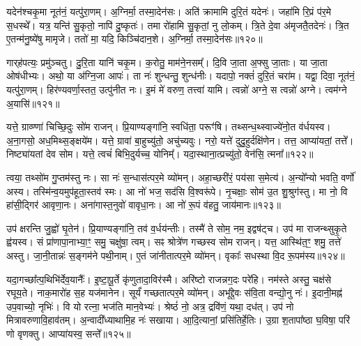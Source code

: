 यदेन॑श्चकृ॒मा नूत॑नं॒ यत्पु॑रा॒णम्।
अ॒ग्निर्मा॒ तस्मा॒देन॑सः।
अति॑ क्रामामि दुरि॒तं यदेनः॑।
जहा॑मि रि॒प्रं प॑र॒मे स॒धस्थे᳚।
यत्र॒ यन्ति॑ सु॒कृतो॒ नापि॑ दु॒ष्कृतः॑।
तमा रो॑हामि सु॒कृतां॒ नु लो॒कम्।
त्रि॒ते दे॒वा अ॑मृजतै॒तदेनः॑।
त्रि॒त ए॒तन्म॑नु॒ष्ये॑षु मामृजे।
ततो॑ मा॒ यदि॒ किञ्चि॑दान॒शे।
अ॒ग्निर्मा॒ तस्मा॒देन॑सः॥१२०॥\ip

गार्‌\mbox{}ह॑पत्यः॒ प्रमु॑ञ्चतु।
दु॒रि॒ता यानि॑ चकृ॒म।
क॒रोतु॒ माम॑ने॒नसम्᳚।
दि॒वि जा॒ता अ॒फ्सु जा॒ताः।
या जा॒ता ओष॑धीभ्यः।
अथो॒ या अ॑ग्नि॒जा आपः॑।
ता नः॑ शुन्धन्तु॒ शुन्ध॑नीः।
यदापो॒ नक्तं॑ दुरि॒तं चरा॑म।
यद्वा॒ दिवा॒ नूत॑नं॒ यत्पु॑रा॒णम्।
हिर॑ण्यवर्णा॒स्तत॒ उत्पु॑नीत नः।
इ॒मं मे॑ वरुण॒ तत्त्वा॑ यामि।
त्वन्नो॑ अग्ने॒ स त्वन्नो॑ अग्ने।
त्वम॑ग्ने अ॒यासि॑॥१२१॥\ip\anuvakamend[अ॒ने॒नस॑मष्ठी॒वद्भ्याꣳ॑ स॒ति प॑रा॒शसा॑\-ऽऽन॒शे᳚\-ऽग्निर्मा॒ तस्मा॒देन॑सः पुनीत न॒स्त्रीणि॑ च (यद्दे॑वा॒ देवा॑ ऋ॒तेन॑ सजातश॒ꣳ॒साद्यद्वा॒चा यद्धस्ता᳚भ्या॒मदी᳚व्यं॒ यन्मयि॑ मा॒ता यदा॑ पि॒पेष॒ यद॒न्तरि॑क्षं॒ यदा॒शसाऽति॑ क्रामामि त्रि॒ते दे॒वा दि॒वि जा॒ता अ॒फ्सु जा॒ता यदाप॑ इ॒मं मे॑ वरुण॒ तत्त्वा॑ यामि॒ त्वन्नो॑ अग्ने॒ स त्वन्नो॑ अग्ने॒ त्वम॑ग्ने अ॒यासि॑।)]

यत्ते॒ ग्राव्ण्णा॑ चिच्छि॒दुः सो॑म राजन्।
प्रि॒याण्यङ्गा॑नि॒ स्वधि॑ता॒ परूꣳ॑षि।
तथ्सन्ध॒थ्स्वाज्ये॑नो॒त व॑र्धयस्व।
अ॒ना॒गसो॒ अध॒मिथ्स॒ङ्क्षये॑म।
यत्ते॒ ग्रावा॑ बा॒हुच्यु॑तो॒ अचु॑च्यवुः।
नरो॒ यत्ते॑ दुदु॒हुर्दक्षि॑णेन।
तत्त॒ आप्या॑यतां॒ तत्ते᳚।
निष्ट्या॑यतां देव सोम।
यत्ते॒ त्वचं॑ बिभि॒दुर्यच्च॒ योनिम्᳚।
यदा॒स्थाना॒त्प्रच्यु॑तो॒ वेन॑सि॒ त्मना᳚॥१२२॥\ip

त्वया॒ तथ्सो॑म गु॒प्तम॑स्तु नः।
सा नः॑ स॒न्धास॑त्पर॒मे व्यो॑मन्।
अहा॒च्छरी॑रं॒ पय॑सा स॒मेत्य॑।
अ॒न्यो᳚न्यो भवति॒ वर्णो॑ अस्य।
तस्मि॑न्व॒यमुप॑हूता॒स्तव॑ स्मः।
आ नो॑ भज॒ सद॑सि वि॒श्वरू॑पे।
नृ॒चक्षाः॒ सोम॑ उ॒त शु॒श्रुग॑स्तु।
मा नो॒ वि हा॑सी॒द्गिर॑ आवृणा॒नः।
अना॑गास्त॒नुवो॑ वावृधा॒नः।
आ नो॑ रू॒पं व॑हतु॒ जाय॑मानः॥१२३॥\ip

उप॑ क्षरन्ति जु॒ह्वो॑ घृ॒तेन॑।
प्रि॒याण्यङ्गा॑नि॒ तव॑ व॒र्धय॑न्तीः।
तस्मै॑ ते सोम॒ नम॒ इद्वष॑ट्च।
उप॑ मा राजन्थ्सुकृ॒ते ह्व॑यस्व।
सं प्रा॑णापा॒नाभ्या॒ꣳ॒ समु॒ चक्षु॑षा॒ त्वम्।
सꣴ श्रोत्रे॑ण गच्छस्व सोम राजन्।
यत्त॒ आस्थि॑त॒ꣳ॒ शमु॒ तत्ते॑ अस्तु।
जा॒नी॒तान्नः॑ स॒ङ्गम॑ने पथी॒नाम्।
ए॒तं जा॑नीतात्पर॒मे व्यो॑मन्।
वृकाः᳚ सधस्था वि॒द रू॒पम॑स्य॥१२४॥\ip

यदा॒गच्छा᳚त्प॒थिभि॑र्देव॒यानैः᳚।
इ॒ष्टा॒पू॒र्ते कृ॑णुतादा॒विर॑स्मै।
अरि॑ष्टो राजन्नग॒दः परे॑हि।
नम॑स्ते अस्तु॒ चक्ष॑से रघूय॒ते।
नाक॒मारो॑ह स॒ह यज॑मानेन।
सूर्यं॑ गच्छतात्पर॒मे व्यो॑मन्।
अभू᳚द्दे॒वः स॑वि॒ता वन्द्यो॒नु नः॑।
इ॒दानी॒मह्न॑ उप॒वाच्यो॒ नृभिः॑।
वि यो रत्ना॒ भज॑ति मान॒वेभ्यः॑।
श्रेष्ठं॑ नो॒ अत्र॒ द्रवि॑णं॒ यथा॒ दध॑त्।
उप॑ नो मित्रावरुणावि॒हाव॑तम्।
अ॒न्वादी᳚ध्याथामि॒ह नः॑ सखाया।
आ॒दि॒त्यानां॒ प्रसि॑तिर्\mbox{}हे॒तिः।
उ॒ग्रा श॒तापा᳚ष्ठा घ॒विषा॒ परि॑ णो वृणक्तु।
आप्या॑यस्व॒ सन्ते᳚॥१२५॥\ip\anuvakamend[त्मना॒ जाय॑मानो\-ऽस्य॒ दध॒त्पञ्च॑ च]

